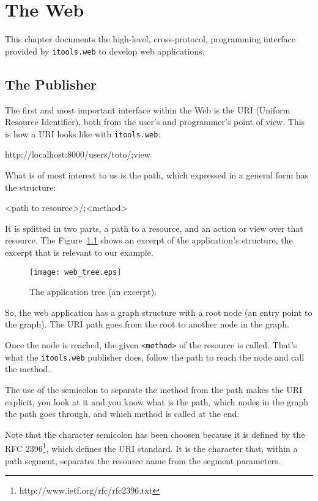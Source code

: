 \chapter{The Web}

This chapter documents the high-level, cross-protocol, programming interface
provided by {\tt itools.web} to develop web applications.


\section{The Publisher}

The first and most important interface within the Web is the URI (Uniform
Resource Identifier), both from the user's and programmer's point of view.
This is how a URI looks like with {\tt itools.web}:

\begin{code}
    http://localhost:8000/users/toto/;view
\end{code}

What is of most interest to us is the path, which expressed in a general
form has the structure:

\begin{code}
    <path to resource>/;<method>
\end{code}

It is splitted in two parts, a path to a resource, and an action or view
over that resource. The Figure~\ref{Figure: web tree} shows an excerpt
of the application's structure, the excerpt that is relevant to our example.

\begin{figure}
  \center
  \texttt{[image: web\_tree.eps]}
  \caption{The application tree (an excerpt).}
  \label{Figure: web tree}
\end{figure}

So, the web application has a graph structure with a root node (an entry
point to the graph). The URI path goes from the root to another node in
the graph.

Once the node is reached, the given {\tt <method>} of the resource is called.
That's what the {\tt itools.web} publisher does, follow the path to reach
the node and call the method.

The use of the semicolon to separate the method from the path makes the
URI explicit, you look at it and you know what is the path, which nodes
in the graph the path goes through, and which method is called at the end.

Note that the character semicolon has been choosen because it is defined
by the RFC 2396\footnote{http://www.ietf.org/rfc/rfc2396.txt}, which defines
the URI standard. It is the character that, within a path segment, separates
the resource name from the segment parameters.



